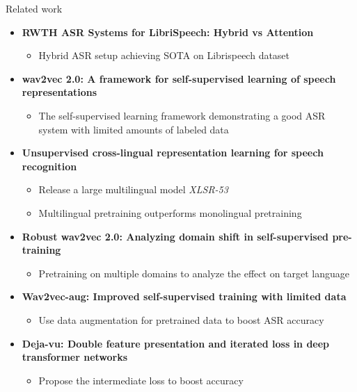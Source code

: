 \begin{frame}{Related work}

\begin{itemize}
    \item \textbf{RWTH ASR Systems for LibriSpeech: Hybrid vs Attention} \cite{RASR-hybrid_vs_attention}
        \begin{itemize}
            \item Hybrid ASR setup achieving SOTA on Librispeech dataset
        \end{itemize}
        
    \item \textbf{wav2vec 2.0: A framework for self-supervised learning of speech representations} \cite{facebookwav2vec2}
        \begin{itemize}
            \item The self-supervised learning framework demonstrating a good ASR system with limited amounts of labeled data
        \end{itemize}
        
    \item \textbf{Unsupervised cross-lingual representation learning for speech recognition} \cite{XLSR}
        \begin{itemize}
            \item Release a large multilingual model \textit{XLSR-53} 
            \item Multilingual pretraining outperforms monolingual pretraining
        \end{itemize}

    \item \textbf{Robust wav2vec 2.0: Analyzing domain shift in self-supervised pre-training} \cite{robust_wav2vec2}
        \begin{itemize}
            \item Pretraining on multiple domains to analyze the effect on target language
        \end{itemize}
    
    \item \textbf{Wav2vec-aug: Improved self-supervised training with limited data} \cite{facebook2022wav2vecaug}
        \begin{itemize}
            \item Use data augmentation for pretrained data to boost ASR accuracy
        \end{itemize}
    
    \item \textbf{Deja-vu: Double feature presentation and iterated loss in deep transformer networks} \cite{facebook2020dejavu}
        \begin{itemize}
            \item Propose the intermediate loss to boost accuracy
        \end{itemize} 
    
\end{itemize}

\end{frame}